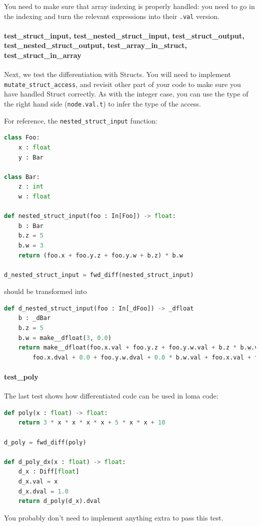 You need to make sure that array indexing is properly handled: you need to go in the indexing and turn the relevant expressions into their \lstinline{.val} version.

\paragraph{test_struct_input, test_nested_struct_input, test_struct_output, test_nested_struct_output, test_array_in_struct, test_struct_in_array} Next, we test the differentiation with Structs. You will need to implement \lstinline{mutate_struct_access}, and revisit other part of your code to make sure you have handled Struct correctly. As with the integer case, you can use the type of the right hand side (\lstinline{node.val.t}) to infer the type of the access.

For reference, the \lstinline{nested_struct_input} function:
\begin{lstlisting}[language=Python]
class Foo:
    x : float
    y : Bar

class Bar:
    z : int
    w : float

def nested_struct_input(foo : In[Foo]) -> float:
    b : Bar
    b.z = 5
    b.w = 3
    return (foo.x + foo.y.z + foo.y.w + b.z) * b.w

d_nested_struct_input = fwd_diff(nested_struct_input)
\end{lstlisting}
should be transformed into
\begin{lstlisting}[language=Python]
def d_nested_struct_input(foo : In[_dFoo]) -> _dfloat
    b : _dBar
    b.z = 5
    b.w = make__dfloat(3, 0.0)
    return make__dfloat(foo.x.val + foo.y.z + foo.y.w.val + b.z * b.w.val,
        foo.x.dval + 0.0 + foo.y.w.dval + 0.0 * b.w.val + foo.x.val + foo.y.z + foo.y.w.val + b.z * b.w.dval)
\end{lstlisting}

\paragraph{test_poly} The last test shows how differentiated code can be used in loma code:
\begin{lstlisting}[language=Python]
def poly(x : float) -> float:
    return 3 * x * x * x * x + 5 * x * x + 10

d_poly = fwd_diff(poly)

def d_poly_dx(x : float) -> float:
    d_x : Diff[float]
    d_x.val = x
    d_x.dval = 1.0
    return d_poly(d_x).dval
\end{lstlisting}
You probably don't need to implement anything extra to pass this test.

